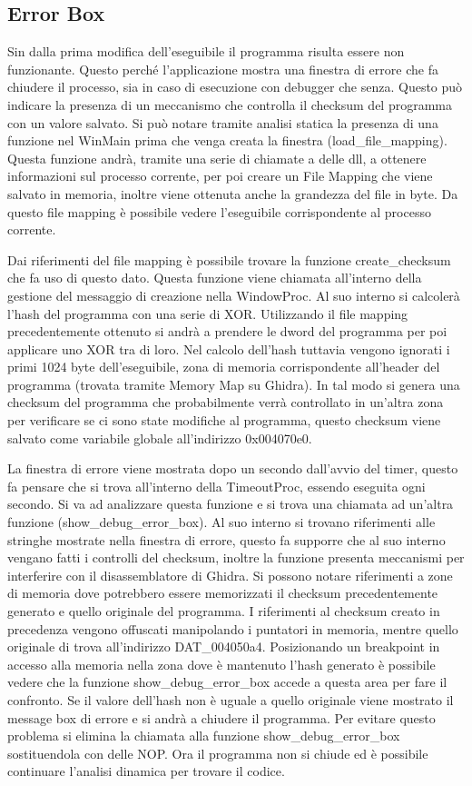 \documentclass[a4paper,12pt]{article}
\begin{document}
\subsection{Error Box}
Sin dalla prima modifica dell'eseguibile il programma risulta essere non funzionante. Questo perché l'applicazione mostra una finestra di errore che fa chiudere il processo, sia in caso di esecuzione con debugger che senza.  Questo può indicare la presenza di un meccanismo che controlla il checksum del programma con un valore salvato. Si può notare tramite analisi statica la presenza di una funzione nel WinMain prima che venga creata la finestra (load\_file\_mapping). Questa funzione andrà, tramite una serie di chiamate a delle dll, a ottenere informazioni sul processo corrente, per poi creare un File Mapping che viene salvato in memoria, inoltre viene ottenuta anche la grandezza del file in byte. Da questo file mapping è possibile vedere l'eseguibile corrispondente al processo corrente.

Dai riferimenti del file mapping è possibile trovare la funzione create\_checksum che fa uso di questo dato. Questa funzione viene chiamata all'interno della gestione del messaggio di creazione nella WindowProc. 
Al suo interno si calcolerà l'hash del programma con una serie di XOR. Utilizzando il file mapping precedentemente ottenuto si andrà a prendere le dword del programma per poi applicare uno XOR tra di loro.  Nel calcolo dell'hash tuttavia vengono ignorati i primi 1024 byte dell'eseguibile, zona di memoria corrispondente all'header del programma (trovata tramite Memory Map su Ghidra).
In tal modo si genera una checksum del programma che probabilmente verrà controllato in un'altra zona per verificare se ci sono state modifiche al programma, questo checksum viene salvato come variabile globale all'indirizzo 0x004070e0.  

La finestra di errore viene mostrata dopo un secondo dall'avvio del timer, questo fa pensare che si trova all'interno della TimeoutProc, essendo eseguita ogni secondo. Si va ad analizzare questa funzione e si trova una chiamata ad un'altra funzione (show\_debug\_error\_box). Al suo interno si trovano riferimenti alle stringhe mostrate nella finestra di errore, questo fa supporre che al suo interno vengano fatti i controlli del checksum, inoltre la funzione presenta meccanismi per interferire con il disassemblatore di Ghidra. 
Si possono notare riferimenti a zone di memoria dove potrebbero essere memorizzati il checksum precedentemente generato e quello originale del programma. I riferimenti al checksum creato in precedenza vengono offuscati manipolando i puntatori in memoria, mentre quello originale di trova all'indirizzo DAT\_004050a4. Posizionando un breakpoint in accesso alla memoria nella zona dove è mantenuto l'hash generato è possibile vedere che la funzione show\_debug\_error\_box accede a questa area per fare il confronto. Se il valore dell'hash non è uguale a quello originale viene mostrato il message box di errore e si andrà a chiudere il programma. Per evitare questo problema si elimina la chiamata alla funzione show\_debug\_error\_box sostituendola con delle NOP. Ora il programma non si chiude ed è possibile continuare l'analisi dinamica per trovare il codice.
\end{document}
